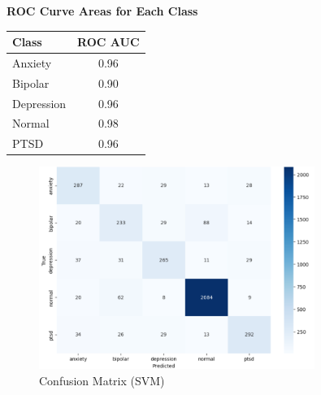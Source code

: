 \vspace{0.25em}

\begin{center}
    \textbf{ROC Curve Areas for Each Class} \\[0.5em]
    \begin{tabular}{|l|c|}
        \hline
        \textbf{Class}  & \textbf{ROC AUC} \\ \hline
        Anxiety         & 0.96            \\ \hline
        Bipolar         & 0.90            \\ \hline
        Depression      & 0.96            \\ \hline
        Normal          & 0.98            \\ \hline
        PTSD            & 0.96            \\ \hline
    \end{tabular}
\end{center}

\vspace{0.25em}

\begin{figure}[h!]  
    \centering
    \includegraphics[width=0.8\textwidth]{Images/SVM Confusion Matrix.png}  
    \caption{Confusion Matrix (SVM)}
    \label{SVMCM}  %
\end{figure}

